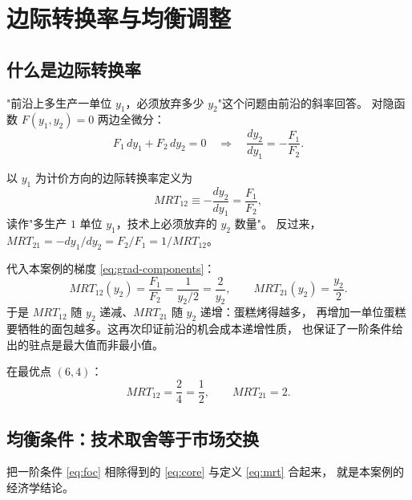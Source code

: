 
\section{边际转换率与均衡调整}
\label{sec:mrt}

\subsection{什么是边际转换率}

"前沿上多生产一单位 $y_1$，必须放弃多少 $y_2$"这个问题由前沿的斜率回答。
对隐函数 $F(y_1,y_2)=0$ 两边全微分：
\begin{equation}
F_1\,dy_1+F_2\,dy_2=0
\quad\Longrightarrow\quad
\frac{dy_2}{dy_1}=-\frac{F_1}{F_2}.
\label{eq:implicit-diff}
\end{equation}

\begin{definition}[边际转换率]
以 $y_1$ 为计价方向的边际转换率定义为
\begin{equation}
MRT_{12}\equiv-\frac{dy_2}{dy_1}=\frac{F_1}{F_2},
\label{eq:mrt}
\end{equation}
读作"多生产 $1$ 单位 $y_1$，技术上必须放弃的 $y_2$ 数量"。
反过来，$MRT_{21}=-dy_1/dy_2=F_2/F_1=1/MRT_{12}$。
\end{definition}

代入本案例的梯度 \eqref{eq:grad-components}：
\begin{equation}
MRT_{12}(y_2)=\frac{F_1}{F_2}=\frac{1}{y_2/2}=\frac{2}{y_2},
\qquad
MRT_{21}(y_2)=\frac{y_2}{2}.
\label{eq:mrt-example}
\end{equation}
于是 $MRT_{12}$ 随 $y_2$ 递减、$MRT_{21}$ 随 $y_2$ 递增：蛋糕烤得越多，
再增加一单位蛋糕要牺牲的面包越多。这再次印证前沿的机会成本递增性质，
也保证了一阶条件给出的驻点是最大值而非最小值。

在最优点 $(6,4)$：
\begin{equation}
MRT_{12}=\frac{2}{4}=\frac12,\qquad MRT_{21}=2.
\label{eq:mrt-at-opt}
\end{equation}

\subsection{均衡条件：技术取舍等于市场交换}

把一阶条件 \eqref{eq:foc} 相除得到的 \eqref{eq:core} 与定义 \eqref{eq:mrt} 合起来，
就是本案例的经济学结论。

